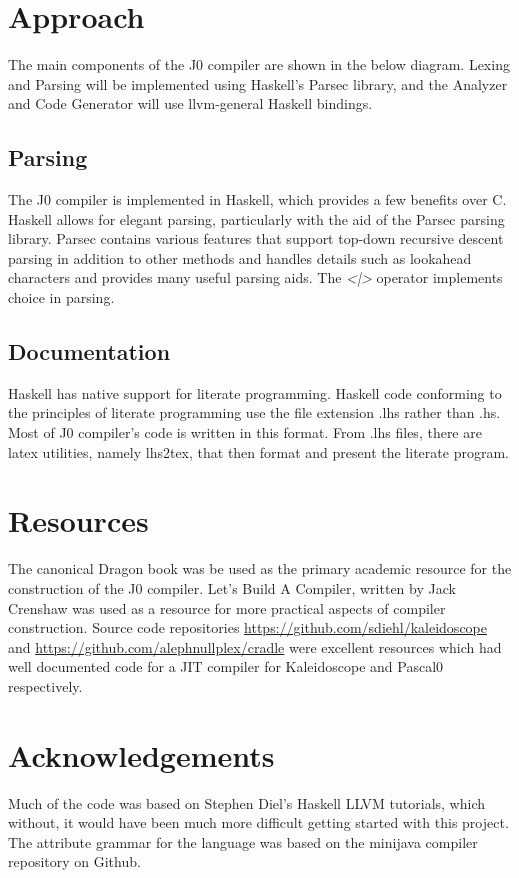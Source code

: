 \documentclass[11pt,a4paper]{article}
\begin{document}
\section{Approach}
The main components of the J0 compiler are shown in the below diagram. Lexing and Parsing will be implemented
using Haskell's Parsec library, and the Analyzer and Code Generator will use llvm-general Haskell bindings.


\subsection{Parsing}
The J0 compiler is implemented in Haskell, which provides a few benefits over C. Haskell allows for
elegant parsing, particularly with the aid of the Parsec parsing library. Parsec contains various features
that support top-down recursive descent parsing in addition to other methods and handles details such as 
lookahead characters
and provides many useful parsing aids. The \emph{<|>} operator implements choice
in parsing. 

\subsection{Documentation}
Haskell has native support for literate programming. Haskell code conforming to the principles of literate
programming use the file extension .lhs rather than .hs. Most of J0 compiler's code is written in this
format. From .lhs files, there are latex utilities, namely lhs2tex, that then format and present the 
literate program.

\section{Resources}
The canonical Dragon book was be used as the primary academic resource for the construction of the J0 compiler.
Let's Build A Compiler, written by Jack Crenshaw was used as a resource for more practical aspects of compiler
construction. Source code repositories \url{https://github.com/sdiehl/kaleidoscope} and 
\url{https://github.com/alephnullplex/cradle} were excellent resources which had well documented code for
a JIT compiler for Kaleidoscope and Pascal0 respectively.

\section{Acknowledgements}
Much of the code was based on Stephen Diel's Haskell LLVM tutorials, which without, it would have been much more
difficult getting started with this project. The attribute grammar for the language was based on the minijava compiler repository on Github.
\end{document}

